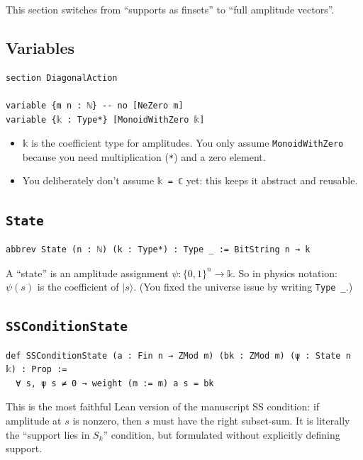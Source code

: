 \documentclass[11pt]{article}
\newcommand{\ket}[1]{\lvert #1 \rangle}
\begin{document}
This section switches from “supports as finsets” to “full amplitude vectors”.

\subsection*{Variables}

\begin{lstlisting}
section DiagonalAction

variable {m n : ℕ} -- no [NeZero m]
variable {𝕜 : Type*} [MonoidWithZero 𝕜]
\end{lstlisting}

\begin{itemize}
\item \texttt{𝕜} is the coefficient type for amplitudes. You only assume \texttt{MonoidWithZero} because you need multiplication (\texttt{*}) and a zero element.
\item You deliberately don’t assume \texttt{𝕜 = ℂ} yet: this keeps it abstract and reusable.
\end{itemize}

\subsection*{\texttt{State}}

\begin{lstlisting}
abbrev State (n : ℕ) (k : Type*) : Type _ := BitString n → k
\end{lstlisting}

A “state” is an amplitude assignment $\psi:\{0,1\}^n\to\mathbb{k}$.
So in physics notation: $\psi(s)$ is the coefficient of $\ket{s}$.
(You fixed the universe issue by writing \texttt{Type \_}.)

\subsection*{\texttt{SSConditionState}}

\begin{lstlisting}
def SSConditionState (a : Fin n → ZMod m) (bk : ZMod m) (ψ : State n 𝕜) : Prop :=
  ∀ s, ψ s ≠ 0 → weight (m := m) a s = bk
\end{lstlisting}

This is the most faithful Lean version of the manuscript SS condition:
if amplitude at $s$ is nonzero, then $s$ must have the right subset-sum.
It is literally the “support lies in $S_k$” condition, but formulated without explicitly defining support.
\end{document}
